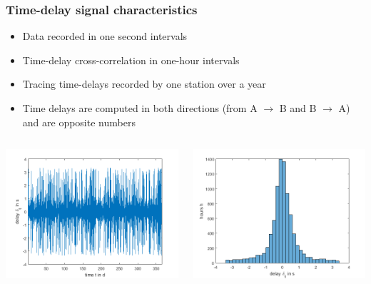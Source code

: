 \documentclass{beamer}
\begin{document}
\begin{frame}
\frametitle{Time-delay signal characteristics}
\begin{itemize}
\item Data recorded in one second intervals
\item Time-delay cross-correlation in one-hour intervals
\item Tracing time-delays recorded by one station over a year
\item Time delays are computed in both directions (from A $\rightarrow$ B and B $\rightarrow$ A) and are opposite numbers
\end{itemize}

\begin{columns}
\includegraphics[width=\textwidth]{delayevolutionovertimeforonestation2.png}

\includegraphics[width=\textwidth]{delayevolutionovertimeforonestation.png}
\end{columns}
\end{frame}
\end{document}

